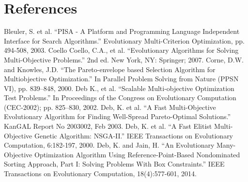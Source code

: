 %
%

\chapter{References}
\label{chpt:references}

Bleuler, S. et al.  ``PISA - A Platform and Programming Language Independent Interface for Search Algorithms.''  Evolutionary Multi-Criterion Optimization, pp. 494-508, 2003.
\newline
\newline
\noindent
Coello Coello, C.A., et al.  ``Evolutionary Algorithms for Solving Multi-Objective Problems.'' 2nd ed. New York, NY: Springer; 2007.
\newline
\newline
\noindent
Corne, D.W. and Knowles, J.D.  ``The Pareto-envelope based Selection Algorithm for Multiobjective Optimization.''  In Parallel Problem Solving from Nature (PPSN VI), pp. 839–848, 2000.
\newline
\newline
\noindent
Deb K., et al. ``Scalable Multi-objective Optimization Test Problems.'' In Proceedings of the Congress on Evolutionary Computation (CEC-2002); pp. 825–830, 2002.
\newline
\newline
\noindent
Deb, K. et al. ``A Fast Multi-Objective Evolutionary Algorithm for Finding Well-Spread Pareto-Optimal Solutions.'' KanGAL Report No 2003002, Feb 2003. 
\newline
\newline
\noindent
Deb, K. et al.  ``A Fast Elitist Multi-Objective Genetic Algorithm: NSGA-II.''  IEEE Transactions on Evolutionary Computation, 6:182-197, 2000.
\newline
\newline
\noindent
Deb, K. and Jain, H.  ``An Evolutionary Many-Objective Optimization Algorithm Using Reference-Point-Based Nondominated Sorting Approach, Part I: Solving Problems With Box Constraints.''  IEEE Transactions on Evolutionary Computation, 18(4):577-601, 2014.
